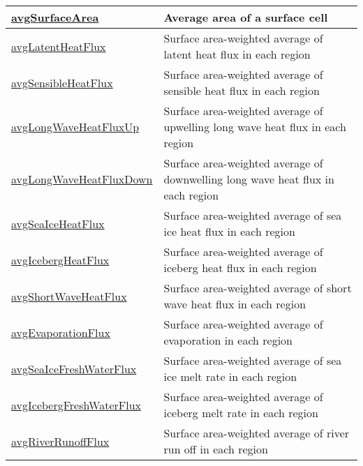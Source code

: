 {\begin{center}
\begin{longtable}{| p{2.0in} | p{4.0in} |}
    \hline
    \hyperref[subsec:var_sec_surfaceAreaWeightedAveragesAM_avgSurfaceArea]{avgSurfaceArea} & Average area of a surface cell \\
    \hline
    \hyperref[subsec:var_sec_surfaceAreaWeightedAveragesAM_avgLatentHeatFlux]{avgLatentHeatFlux} & Surface area-weighted average of latent heat flux in each region \\
    \hline
    \hyperref[subsec:var_sec_surfaceAreaWeightedAveragesAM_avgSensibleHeatFlux]{avgSensibleHeatFlux} & Surface area-weighted average of sensible heat flux in each region \\
    \hline
    \hyperref[subsec:var_sec_surfaceAreaWeightedAveragesAM_avgLongWaveHeatFluxUp]{avgLongWaveHeatFluxUp} & Surface area-weighted average of upwelling long wave heat flux in each region \\
    \hline
    \hyperref[subsec:var_sec_surfaceAreaWeightedAveragesAM_avgLongWaveHeatFluxDown]{avgLongWaveHeatFluxDown} & Surface area-weighted average of downwelling long wave heat flux in each region \\
    \hline
    \hyperref[subsec:var_sec_surfaceAreaWeightedAveragesAM_avgSeaIceHeatFlux]{avgSeaIceHeatFlux} & Surface area-weighted average of sea ice heat flux in each region \\
    \hline
    \hyperref[subsec:var_sec_surfaceAreaWeightedAveragesAM_avgIcebergHeatFlux]{avgIcebergHeatFlux} & Surface area-weighted average of iceberg heat flux in each region \\
    \hline
    \hyperref[subsec:var_sec_surfaceAreaWeightedAveragesAM_avgShortWaveHeatFlux]{avgShortWaveHeatFlux} & Surface area-weighted average of short wave heat flux in each region \\
    \hline
    \hyperref[subsec:var_sec_surfaceAreaWeightedAveragesAM_avgEvaporationFlux]{avgEvaporationFlux} & Surface area-weighted average of evaporation in each region \\
    \hline
    \hyperref[subsec:var_sec_surfaceAreaWeightedAveragesAM_avgSeaIceFreshWaterFlux]{avgSeaIceFreshWaterFlux} & Surface area-weighted average of sea ice melt rate in each region \\
    \hline
    \hyperref[subsec:var_sec_surfaceAreaWeightedAveragesAM_avgIcebergFreshWaterFlux]{avgIcebergFreshWaterFlux} & Surface area-weighted average of iceberg melt rate in each region \\
    \hline
    \hyperref[subsec:var_sec_surfaceAreaWeightedAveragesAM_avgRiverRunoffFlux]{avgRiverRunoffFlux} & Surface area-weighted average of river run off in each region \\

\end{longtable}
\end{center}}
